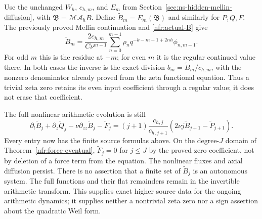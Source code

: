 Use the unchanged \(W_h\), \(c_{h,m}\), and \(E_m\) from
Section~\ref{sec:ns-hidden-mellin-diffusion}, with
\(\mathfrak B=\mathcal M\mathcal A_hB\). Define
\(\widetilde B_m=E_m(\mathfrak B)\) and similarly for \(P,Q,F\).
The previously proved Mellin continuation and \eqref{nfr:actual-B} give
\begin{equation}\label{nfr:arithmetic}
 \widetilde B_m=\frac{2c_{h,m}}{C\nu^{m-1}}
       \sum_{n=0}^{m-1}\rho_nq^{-k-m+1+2nh}\phi_{n,m-1}.
\end{equation}
For odd \(m\) this is the residue at \(-m\); for even \(m\) it
is the regular continued value there. In both cases the inverse is
the exact division \(b_m=\widetilde B_m/c_{h,m}\), with the nonzero
denominator already proved from the zeta functional equation.
Thus a trivial zeta zero retains its even input coefficient through
a regular value; it does not erase that coefficient.

The full nonlinear arithmetic evolution is still
\[
 \partial_t\widetilde B_j+\partial_z\widetilde Q_j
       -\nu\partial_{zz}\widetilde B_j-\widetilde F_j
  =(j+1)\frac{c_{h,j}}{c_{h,j+1}}
       (2\nu j\widetilde B_{j+1}-\widetilde P_{j+1}).
\]
Every entry now has the finite source formulas above. On the
degree-\(J\) domain of Theorem~\ref{nfr:force-eventual},
\(\widetilde F_j=0\) for \(j\leq J\) by the proved zero
coefficient, not by deletion of a force term from the equation.
The nonlinear fluxes and axial diffusion persist. There is no assertion
that a finite set of \(\widetilde B_j\) is an autonomous system.
The full functions and their flat remainders remain in the invertible
arithmetic transform. This supplies exact higher source data for the
ongoing arithmetic dynamics; it supplies neither a nontrivial zeta
zero nor a sign assertion about the quadratic Weil form.
